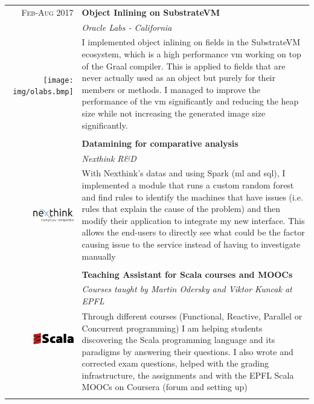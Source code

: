 \documentclass[a4paper,11pt]{article} %
\begin{document}
\begin{tabularx}{\textwidth}{r|X}

\textsc{Feb-Aug 2017} & \textbf{Object Inlining on SubstrateVM} \\
\multirow{4}{*}{ \texttt{[image: img/olabs.bmp]}}
& \emph{Oracle Labs - California}\\ 
& \footnotesize{I implemented object inlining on fields in the SubstrateVM ecosystem, which is a high performance vm working on top of the Graal compiler. This is applied to fields that are never actually used as an object but purely for their members or methods. I managed to improve the performance of the vm significantly and reducing the heap size while not increasing the generated image size significantly. }\\
\multicolumn{2}{c}{} \\


\textsc{July 2016-Sept 2016} & \textbf{Datamining for comparative analysis}\\
\multirow{4}{*}{ \includegraphics[width=50pt]{img/nexthinkLogo.png}}
& \emph{Nexthink R\&D}\\
& \footnotesize{With Nexthink's datas and using Spark (ml and sql), I implemented a module that runs a custom random forest and find rules to identify the machines that have issues (i.e. rules that explain the cause of the problem) and then modify their application to integrate my new interface. This allows the end-users to directly see what could be the factor causing issue to the service instead of having to investigate manually}\\
\multicolumn{2}{c}{} \\


\textsc{Feb 2015-Feb 2017} & \textbf{Teaching Assistant for Scala courses and MOOCs} \\
\multirow{4}{*}{ \includegraphics[width=50pt]{img/Scala.eps}}
& \emph{Courses taught by Martin Odersky and Viktor Kuncak at EPFL}\\ 
& \footnotesize{Through different courses (Functional, Reactive, Parallel or Concurrent programming) I am helping students discovering the Scala programming language and its paradigms by answering their questions. I also wrote and corrected exam questions, helped with the grading infrastructure, the assignments and with the EPFL Scala MOOCs on Coursera (forum and setting up) }\\
\multicolumn{2}{c}{} \\


\end{tabularx}
\end{document}
